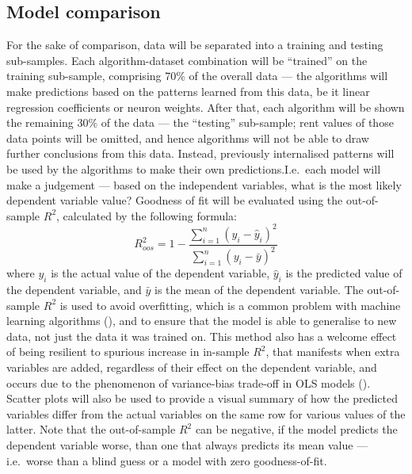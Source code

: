 \documentclass[12pt]{report}
\begin{document}
\subsection{Model comparison}
For the sake of comparison, data will be separated into a training and testing sub-samples. Each algorithm-dataset combination will be ``trained'' on the training sub-sample, comprising 70\% of the overall data --- the algorithms will make predictions based on the patterns learned from this data, be it linear regression coefficients or neuron weights. After that, each algorithm will be shown the remaining 30\% of the data --- the ``testing'' sub-sample; rent values of those data points will be omitted, and hence algorithms will not be able to draw further conclusions from this data. Instead, previously internalised patterns will be used by the algorithms to make their own predictions.\@ I.e.\ each model will make a judgement --- based on the independent variables, what is the most likely dependent variable value? Goodness of fit will be evaluated using the out-of-sample $R^2$, calculated by the following formula:
\begin{equation}
    R^2_{oos} = 1 - \frac{\sum_{i=1}^{n}{{(y_i - \hat{y}_i)}^2}}{\sum_{i=1}^{n}{{(y_i - \bar{y})}^2}}
\end{equation}
where $y_i$ is the actual value of the dependent variable, $\hat{y}_i$ is the predicted value of the dependent variable, and $\bar{y}$ is the mean of the dependent variable. The out-of-sample $R^2$ is used to avoid overfitting, which is a common problem with machine learning algorithms (\cite[p. 2]{hawinkel2023}), and to ensure that the model is able to generalise to new data, not just the data it was trained on. This method also has a welcome effect of being resilient to spurious increase in in-sample $R^2$, that manifests when extra variables are added, regardless of their effect on the dependent variable, and occurs due to the phenomenon of variance-bias trade-off in OLS models (\cite{dalpiaz2021}). Scatter plots will also be used to provide a visual summary of how the predicted variables differ from the actual variables on the same row for various values of the latter. Note that the out-of-sample $R^2$ can be negative, if the model predicts the dependent variable worse, than one that always predicts its mean value --- i.e.\ worse than a blind guess or a model with zero goodness-of-fit.
\end{document}
